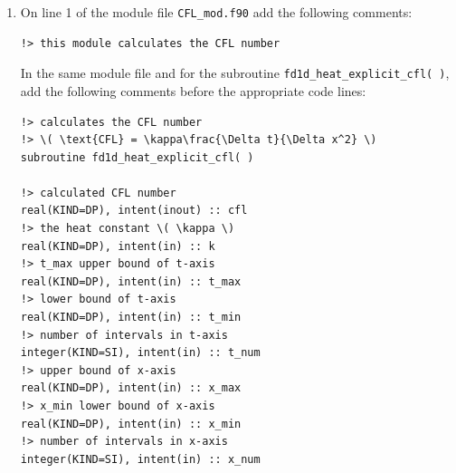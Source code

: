 \documentclass[12pt]{article}
\begin{document}
\begin{enumerate}
\begin{verbatim}
!> \( \frac{\partial H}{\partial t} 
!>     - \kappa\frac{\partial^{2} H}{\partial x^{2}} = f(x) \)
\end{verbatim}
\item On line 1 of the module file \texttt{CFL\_mod.f90} add the following comments:
\begin{verbatim}
!> this module calculates the CFL number
\end{verbatim}
In the same module file and for the subroutine \texttt{fd1d\_heat\_explicit\_cfl( )}, add
the following comments before the appropriate code lines:
\begin{verbatim}
!> calculates the CFL number  
!> \( \text{CFL} = \kappa\frac{\Delta t}{\Delta x^2} \)
subroutine fd1d_heat_explicit_cfl( )

!> calculated CFL number
real(KIND=DP), intent(inout) :: cfl
!> the heat constant \( \kappa \)
real(KIND=DP), intent(in) :: k
!> t_max upper bound of t-axis
real(KIND=DP), intent(in) :: t_max
!> lower bound of t-axis
real(KIND=DP), intent(in) :: t_min
!> number of intervals in t-axis
integer(KIND=SI), intent(in) :: t_num
!> upper bound of x-axis
real(KIND=DP), intent(in) :: x_max
!> x_min lower bound of x-axis
real(KIND=DP), intent(in) :: x_min
!> number of intervals in x-axis
integer(KIND=SI), intent(in) :: x_num
\end{verbatim}


\end{enumerate}
\end{document}
